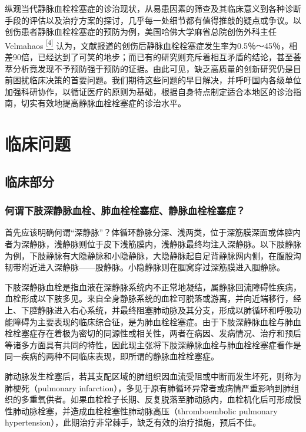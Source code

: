 纵观当代静脉血栓栓塞症的诊治现状，从易患因素的筛查及其临床意义到各种诊断手段的评估以及治疗方案的探讨，几乎每一处细节都有值得推敲的疑点或争议。以创伤患者静脉血栓栓塞症的预防为例，美国哈佛大学麻省总院创伤外科主任Velmahaos
\protect\hyperlink{text00022.htmlux5cux23ch4-21}{\textsuperscript{{[}4{]}}}
认为，文献报道的创伤后静脉血栓栓塞症发生率为0.5％～45％，相差90倍，已经达到了可笑的地步；而已有的研究则充斥着相互矛盾的结论，甚至荟萃分析竟发现不予预防强于预防的证据。由此可见，缺乏高质量的创新研究仍是目前困扰临床决策的首要问题。我们期待这些问题的早日解决，并呼吁国内各级单位加强科研协作，以循证医疗的原则为基础，根据自身特点制定适合本地区的诊治指南，切实有效地提高静脉血栓栓塞症的诊治水平。

\section{临床问题}

\subsection{临床部分}

\subsubsection{何谓下肢深静脉血栓、肺血栓栓塞症、静脉血栓栓塞症？}

首先应该明确何谓“深静脉”？体循环静脉分深、浅两类，位于深筋膜深面或体腔内者为深静脉，浅静脉则位于皮下浅筋膜内，浅静脉最终均注入深静脉。以下肢静脉为例，下肢静脉有大隐静脉和小隐静脉，大隐静脉起自足背静脉网内侧，在腹股沟韧带附近进入深静脉------股静脉。小隐静脉则在腘窝穿过深筋膜进入腘静脉。

下肢深静脉血栓是指血液在深静脉系统内不正常地凝结，属静脉回流障碍性疾病，血栓形成以下肢多见。来自全身静脉系统的血栓可脱落或游离，并向近端移行，经上、下腔静脉进入右心系统，并最终阻塞肺动脉及其分支，形成以肺循环和呼吸功能障碍为主要表现的临床综合征，是为肺血栓栓塞症。由于下肢深静脉血栓与肺血栓栓塞症存在着极为密切的同源性或相关性，两者在病因、发病情况、治疗和预后等诸多方面具有共同的特性，因此现主张将下肢深静脉血栓与肺血栓栓塞症看作是同一疾病的两种不同临床表现，即所谓的静脉血栓栓塞症。

肺动脉发生栓塞后，若其支配区域的肺组织因血流受阻或中断而发生坏死，则称为肺梗死（pulmonary
infarction），多见于原有肺循环异常者或病情严重影响到肺组织的多重氧供者。如果血栓栓子长期、反复脱落至肺动脉内，血栓机化后可形成慢性肺动脉栓塞，并造成血栓栓塞性肺动脉高压（thromboembolic
pulmonary
hypertension），此期治疗非常棘手，缺乏有效的治疗措施，预后不佳。

